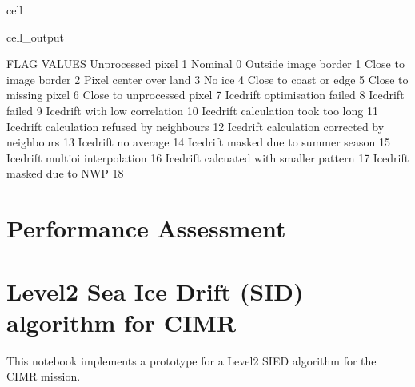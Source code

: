 \documentclass[letterpaper,10pt,english]{jupyterBook}
\begin{document}
\begin{sphinxuseclass}{cell}
\begin{sphinxVerbatimOutput}
\begin{sphinxuseclass}{cell_output}
\noindent{}

\begin{sphinxVerbatim}[commandchars=\\\{\}]
FLAG VALUES 
Unprocessed pixel                              \PYGZhy{}1
Nominal                                        0
Outside image border                           1
Close to image border                          2
Pixel center over land                         3
No ice                                         4
Close to coast or edge                         5
Close to missing pixel                         6
Close to unprocessed pixel                     7
Icedrift optimisation failed                   8
Icedrift failed                                9
Icedrift with low correlation                  10
Icedrift calculation took too long             11
Icedrift calculation refused by neighbours     12
Icedrift calculation corrected by neighbours   13
Icedrift no average                            14
Icedrift masked due to summer season           15
Icedrift multi\PYGZhy{}oi interpolation                16
Icedrift calcuated with smaller pattern        17
Icedrift masked due to NWP                     18
\end{sphinxVerbatim}

\noindent{}

\end{sphinxuseclass}\end{sphinxVerbatimOutput}

\end{sphinxuseclass}
\sphinxstepscope


\chapter{Performance Assessment}
\label{\detokenize{CIMR_L2_Sea_Ice_Drift_performanceAssessment:performance-assessment}}\label{\detokenize{CIMR_L2_Sea_Ice_Drift_performanceAssessment::doc}}

\chapter{Level\sphinxhyphen{}2 Sea Ice Drift (SID) algorithm for CIMR}
\label{\detokenize{CIMR_L2_Sea_Ice_Drift_performanceAssessment:level-2-sea-ice-drift-sid-algorithm-for-cimr}}
\sphinxAtStartPar
This notebook implements a prototype for a Level\sphinxhyphen{}2 SIED algorithm for the CIMR mission.
\end{document}
